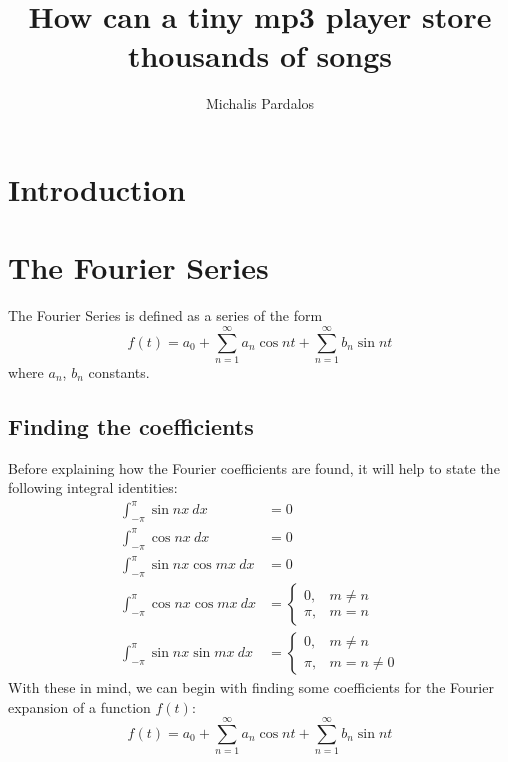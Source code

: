 \documentclass[12pt, titlepage]{article}
\title{How can a tiny mp3 player store thousands of songs}
\author{Michalis Pardalos}
\date{}
\numberwithin{equation}{section}
\let\oldsection\section
\renewcommand\section{\clearpage\oldsection}
\newcommand{\piint}{\int_{-\pi}^{\pi}} %
\begin{document}
\maketitle
\tableofcontents

\section{Introduction}
\section{The Fourier Series}

The Fourier Series is defined as a series of the form
%
\begin{equation} \label{eq:fourier_series}
    f(t) = a_0 + \sum_{n=1}^{\infty}a_n \cos{nt} + \sum_{n=1}^{\infty}b_n \sin{nt}
\end{equation}
%
where $a_n$, $b_n$ constants. 

\subsection{Finding the coefficients} \label{sec:fourier_coefficients}

Before explaining how the Fourier coefficients are found, it will help to state the
following integral identities:\autocite[438]{courant_calculus_1}
%
\begin{align}
    \piint \sin{nx}\ dx          & = 0 \label{eq:sinint}\\
    \piint \cos{nx}\ dx          & = 0 \label{eq:cosint}\\
    \piint \sin{nx}\cos{mx}\ dx & = 0\label{eq:sincosint}\\
    \piint \cos{nx}\cos{mx}\ dx & =
    \begin{cases}
        0,   & m\not=n\\
        \pi, & m=n
    \end{cases} \label{eq:coscosint}\\
    \piint \sin{nx}\sin{mx}\ dx &= 
    \begin{cases}
        0,   & m\not=n\\
        \pi, & m=n\not=0
    \end{cases} \label{eq:sinsinint}
\end{align}
%
With these in mind, we can begin with finding some coefficients for the Fourier expansion of
a function $f(t)$:
%
\begin{equation*}
    f(t) = a_0 + \sum_{n=1}^\infty a_n \cos{nt} + \sum_{n=1}^{\infty} b_n \sin{nt}
\end{equation*}
%
\end{document}
